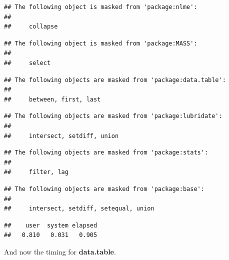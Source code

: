 \documentclass[]{book}
\newenvironment{Shaded}{\begin{snugshade}}{\end{snugshade}}
\newcommand{\DataTypeTok}[1]{\textcolor[rgb]{0.13,0.29,0.53}{#1}}
\newcommand{\KeywordTok}[1]{\textcolor[rgb]{0.13,0.29,0.53}{\textbf{#1}}}
\newcommand{\NormalTok}[1]{#1}
\newcommand{\OperatorTok}[1]{\textcolor[rgb]{0.81,0.36,0.00}{\textbf{#1}}}
\newcommand{\StringTok}[1]{\textcolor[rgb]{0.31,0.60,0.02}{#1}}
\theoremstyle{definition}
\theoremstyle{definition}
\theoremstyle{definition}
\theoremstyle{remark}
\begin{document}
\begin{verbatim}
## The following object is masked from 'package:nlme':
## 
##     collapse
\end{verbatim}

\begin{verbatim}
## The following object is masked from 'package:MASS':
## 
##     select
\end{verbatim}

\begin{verbatim}
## The following objects are masked from 'package:data.table':
## 
##     between, first, last
\end{verbatim}

\begin{verbatim}
## The following objects are masked from 'package:lubridate':
## 
##     intersect, setdiff, union
\end{verbatim}

\begin{verbatim}
## The following objects are masked from 'package:stats':
## 
##     filter, lag
\end{verbatim}

\begin{verbatim}
## The following objects are masked from 'package:base':
## 
##     intersect, setdiff, setequal, union
\end{verbatim}

\begin{Shaded}
\end{Shaded}

\begin{verbatim}
##    user  system elapsed 
##   0.810   0.031   0.905
\end{verbatim}

And now the timing for \textbf{data.table}.
\end{document}
